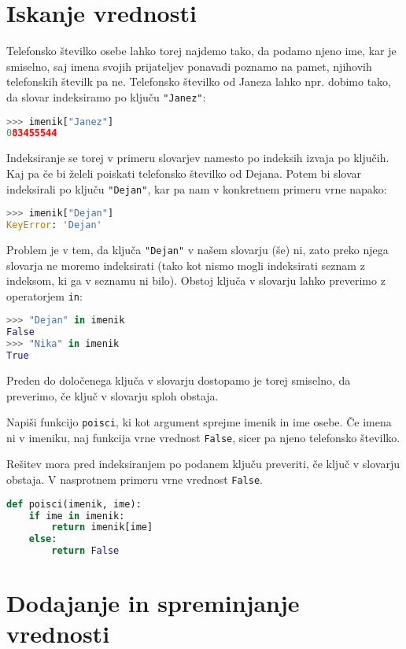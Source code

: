 \section{Iskanje vrednosti}
Telefonsko številko osebe lahko torej najdemo tako, da podamo njeno ime, kar je smiselno, saj imena svojih prijateljev ponavadi poznamo na pamet, njihovih telefonskih številk pa ne. Telefonsko številko od Janeza lahko npr. dobimo tako, da slovar indeksiramo po ključu \texttt{"Janez"}:
\begin{lstlisting}[language=Python]
>>> imenik["Janez"]
083455544
\end{lstlisting}
Indeksiranje se torej v primeru slovarjev namesto po indeksih izvaja po ključih. Kaj pa če bi želeli poiskati telefonsko številko od Dejana. Potem bi slovar indeksirali po ključu \texttt{"Dejan"}, kar pa nam v konkretnem primeru vrne napako:
\begin{lstlisting}[language=Python]
>>> imenik["Dejan"]
KeyError: 'Dejan'
\end{lstlisting}
Problem je v tem, da ključa \texttt{"Dejan"} v našem slovarju (še) ni, zato preko njega slovarja ne moremo indeksirati (tako kot nismo mogli indeksirati seznam z indeksom, ki ga v seznamu ni bilo). Obstoj ključa v slovarju lahko preverimo z operatorjem \texttt{in}:
\begin{lstlisting}[language=Python]
>>> "Dejan" in imenik
False
>>> "Nika" in imenik
True
\end{lstlisting}
Preden do določenega ključa v slovarju dostopamo je torej smiselno, da preverimo, če ključ v slovarju sploh obstaja.
\begin{zgled}
Napiši funkcijo \texttt{poisci}, ki kot argument sprejme imenik in ime osebe. Če imena ni v imeniku, naj funkcija vrne vrednost \texttt{False}, sicer pa njeno telefonsko številko.
\end{zgled}
\begin{resitev} Rešitev mora pred indeksiranjem po podanem ključu preveriti, če ključ v slovarju obstaja. V nasprotnem primeru vrne vrednost \texttt{False}. 
\begin{lstlisting}[language=Python]
def poisci(imenik, ime):
    if ime in imenik:
        return imenik[ime]
    else:
        return False
\end{lstlisting}
\end{resitev}

\section{Dodajanje in spreminjanje vrednosti}

